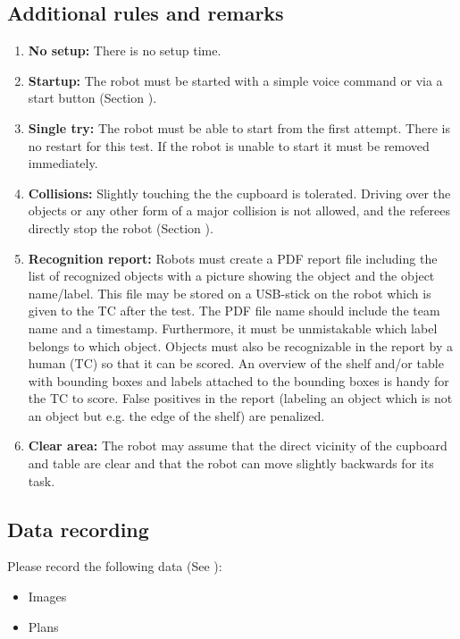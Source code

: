 \subsection{Additional rules and remarks}
\begin{enumerate}
\item \textbf{No setup:} There is no setup time.
\item \textbf{Startup:} The robot must be started with a simple voice command or via a start button (Section ). 
\item \textbf{Single try:} The robot must be able to start from the first attempt. There is no restart for this test. If the robot is unable to start it must be removed immediately.
\item \textbf{Collisions:} Slightly touching the the cupboard is tolerated.
  Driving over the objects or any other form of a major collision is not allowed, and the referees directly stop the robot (Section ).
\item \textbf{Recognition report:} Robots must create a PDF report file including the list of recognized objects with a picture showing the object and the object name/label.
  This file may be stored on a USB-stick on the robot which is given to the TC after the test. The PDF file name should include the team name and a timestamp. 
  Furthermore, it must be unmistakable which label belongs to which object. Objects must also be recognizable in the report by a human (TC) so that it can be scored. 
  An overview of the shelf and/or table with bounding boxes and labels attached to the bounding boxes is handy for the TC to score.
  False positives in the report (labeling an object which is not an object but e.g. the edge of the shelf) are penalized.
  \item \textbf{Clear area: } The robot may assume that the direct vicinity of the cupboard and table are clear and that the robot can move slightly backwards for its task. 
\end{enumerate}

\subsection{Data recording}
  Please record the following data (See ):
  \begin{itemize}
   \item Images
   \item Plans
  \end{itemize}

